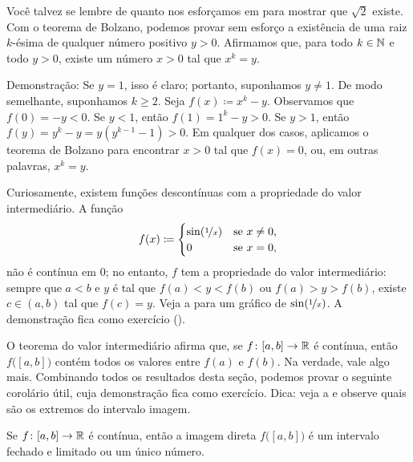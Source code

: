 \begin{example}
Você talvez se lembre de quanto nos esforçamos em
 para mostrar que $\sqrt{2}$ existe.
Com o teorema de Bolzano, podemos provar sem esforço a existência de uma
raiz $k$-ésima de qualquer número positivo $y > 0$.
Afirmamos que, para todo $k \in {\mathbb{N}}$ e todo $y > 0$,
existe um número $x > 0$ tal que $x^k = y$.

Demonstração: Se $y=1$, isso é claro; portanto, suponhamos $y\neq 1$.
De modo semelhante, suponhamos $k \geq 2$.
Seja $f(x) \coloneqq x^k - y$. Observamos que $f(0) = -y < 0$.
Se $y < 1$, então $f(1) = 1^k -y > 0$. Se $y > 1$,
então $f(y) = y^k-y = y(y^{k-1}-1) > 0$.
Em qualquer dos casos, aplicamos o teorema de Bolzano para encontrar
$x > 0$ tal que $f(x) = 0$, ou, em outras palavras, $x^k = y$.
\end{example}

\begin{example}
Curiosamente, existem funções descontínuas com a propriedade do valor
intermediário. A função
\begin{equation*}
f(x) \coloneqq
\begin{cases}
\sin(\nicefrac{1}{x}) & \text{se } x \neq 0, \\
0 & \text{se } x=0,
\end{cases}
\end{equation*}
não é contínua em $0$; no entanto, $f$ tem a propriedade do valor intermediário:
sempre que $a < b$ e $y$ é tal que $f(a) < y < f(b)$
ou $f(a) > y > f(b)$,
existe $c \in (a,b)$ tal que $f(c) = y$.
Veja a  para um gráfico de $\sin(\nicefrac{1}{x})$.
A demonstração fica como exercício
().
\end{example}

O teorema do valor intermediário afirma que, se $f \colon [a,b] \to {\mathbb{R}}$ é
contínua, então $f\bigl([a,b]\bigr)$ contém todos os valores entre $f(a)$ e
$f(b)$. Na verdade, vale algo mais. Combinando todos os resultados desta seção,
podemos provar o seguinte corolário útil, cuja demonstração fica como exercício.
Dica: veja a  e observe quais são os extremos
do intervalo imagem.

\begin{cor} \label{cor:imageofinterval}
Se $f \colon [a,b] \to {\mathbb{R}}$ é contínua, então a imagem direta
$f\bigl([a,b]\bigr)$ é um intervalo fechado e limitado ou um único número.
\end{cor}

